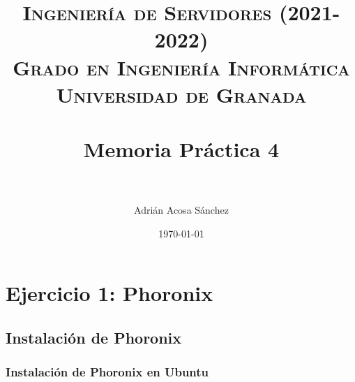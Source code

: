 


\title{	
\normalfont \normalsize 
\textsc{\textbf{Ingeniería de Servidores (2021-2022)} \\ Grado en Ingeniería Informática \\ Universidad de Granada} \\ [25pt] %
\horrule{0.5pt} \\[0.4cm] %
\huge Memoria Práctica 4 \\ %
\horrule{2pt} \\[0.5cm] %
}

\author{Adrián Acosa Sánchez} %

\date{\normalsize\today} %




\maketitle %

\newpage %

\tableofcontents %
 
\newpage


\section{Ejercicio 1: Phoronix}

\subsection{Instalación de Phoronix}

\subsubsection{Instalación de Phoronix en Ubuntu}

